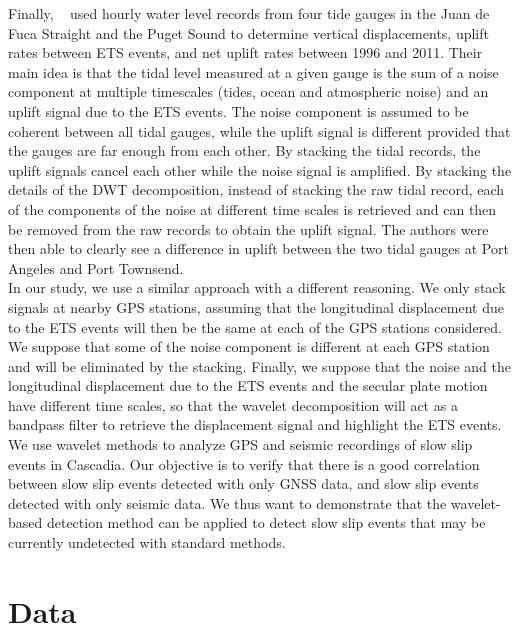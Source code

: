 \documentclass{article}
\begin{document}
Finally, ~\citet{ALB_2019} used hourly water level records from four tide gauges in the Juan de Fuca Straight and the Puget Sound to determine vertical displacements, uplift rates between ETS events, and net uplift rates between 1996 and 2011. Their main idea is that the tidal level measured at a given gauge is the sum of a noise component at multiple timescales (tides, ocean and atmospheric noise) and an uplift signal due to the ETS events. The noise component is assumed to be coherent between all tidal gauges, while the uplift signal is different provided that the gauges are far enough from each other. By stacking the tidal records, the uplift signals cancel each other while the noise signal is amplified. By stacking the details of the DWT decomposition, instead of stacking the raw tidal record, each of the components of the noise at different time scales is retrieved and can then be removed from the raw records to obtain the uplift signal. The authors were then able to clearly see a difference in uplift between the two tidal gauges at Port Angeles and Port Townsend. \\

In our study, we use a similar approach with a different reasoning. We only stack signals at nearby GPS stations, assuming that the longitudinal displacement due to the ETS events will then be the same at each of the GPS stations considered. We suppose that some of the noise component is different at each GPS station and will be eliminated by the stacking. Finally, we suppose that the noise and the longitudinal displacement due to the ETS events and the secular plate motion have different time scales, so that the wavelet decomposition will act as a bandpass filter to retrieve the displacement signal and highlight the ETS events. We use wavelet methods to analyze GPS and seismic recordings of slow slip events in Cascadia. Our objective is to verify that there is a good correlation between slow slip events detected with only GNSS data, and slow slip events detected with only seismic data. We thus want to demonstrate that the wavelet-based detection method can be applied to detect slow slip events that may be currently undetected with standard methods. \\

\section{Data}
\end{document}
